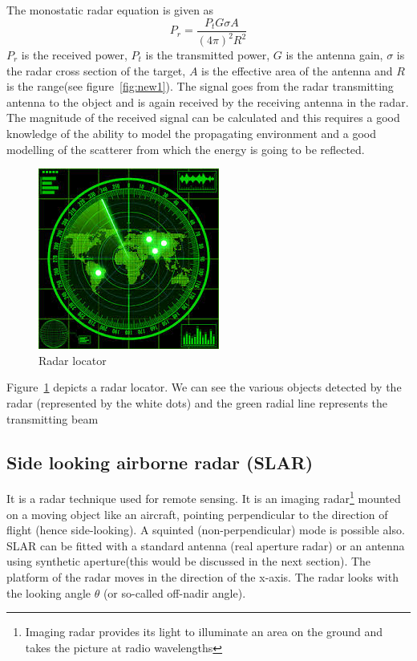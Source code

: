 The monostatic radar equation is given as
\begin{dmath*}
P_{r}= \frac{P_t G\sigma A}{(4\pi)^{2}R^{2}}
\end{dmath*}
$P_{r}$ is the received power, $P_t$ is the transmitted power, $G$ is the antenna gain, $\sigma$ is the radar cross section of the target, $A$ is the effective area of the antenna and $R$ is the range(see  figure~\ref{fig:new1}). The signal goes from the radar transmitting antenna to the object and is again received by the receiving antenna in the radar. The magnitude of the received signal can be calculated and this requires a good knowledge of the ability to model the propagating environment and a good modelling of the scatterer from which the energy is going to be reflected.

\begin{figure}[h]
\centering
\includegraphics[scale=0.5]{./graphics/Radarlocator}
\caption{Radar locator}
\label{fig:radarlocator}
\end{figure}

Figure~\ref{fig:radarlocator} depicts a radar locator. We can see the various objects detected by the radar (represented by the white dots) and the green radial line represents the transmitting beam

\subsection{Side looking airborne radar (SLAR)} 
It is a radar technique used for remote sensing. It is an imaging radar\footnote{Imaging radar provides its light to illuminate an area on the ground and takes the picture at radio wavelengths} mounted on a moving object like an aircraft, pointing perpendicular to the direction of flight (hence side-looking). A squinted (non-perpendicular) mode is possible also. SLAR can be fitted with a standard antenna (real aperture radar) or an antenna using synthetic aperture(this would be discussed in the next section). The platform of the radar moves in the direction of the x-axis. The radar looks with the looking angle $\theta$ (or so-called off-nadir angle).

